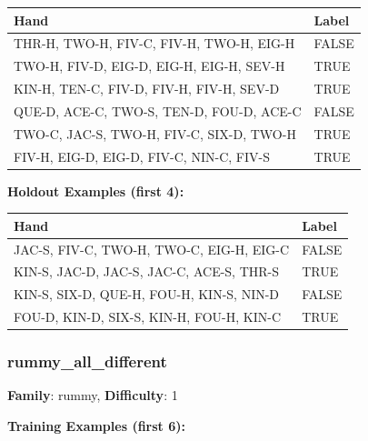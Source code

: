 \documentclass[10pt,a4paper]{article}
\begin{document}
\begin{small}
\begin{tabular}{p{8cm}l}
\toprule
Hand & Label \\
\midrule
THR-H, TWO-H, FIV-C, FIV-H, TWO-H, EIG-H & \textcolor{negative}{FALSE} \\
TWO-H, FIV-D, EIG-D, EIG-H, EIG-H, SEV-H & \textcolor{positive}{TRUE} \\
KIN-H, TEN-C, FIV-D, FIV-H, FIV-H, SEV-D & \textcolor{positive}{TRUE} \\
QUE-D, ACE-C, TWO-S, TEN-D, FOU-D, ACE-C & \textcolor{negative}{FALSE} \\
TWO-C, JAC-S, TWO-H, FIV-C, SIX-D, TWO-H & \textcolor{positive}{TRUE} \\
FIV-H, EIG-D, EIG-D, FIV-C, NIN-C, FIV-S & \textcolor{positive}{TRUE} \\
\bottomrule
\end{tabular}
\end{small}

\textbf{Holdout Examples (first 4):}

\begin{small}
\begin{tabular}{p{8cm}l}
\toprule
Hand & Label \\
\midrule
JAC-S, FIV-C, TWO-H, TWO-C, EIG-H, EIG-C & \textcolor{negative}{FALSE} \\
KIN-S, JAC-D, JAC-S, JAC-C, ACE-S, THR-S & \textcolor{positive}{TRUE} \\
KIN-S, SIX-D, QUE-H, FOU-H, KIN-S, NIN-D & \textcolor{negative}{FALSE} \\
FOU-D, KIN-D, SIX-S, KIN-H, FOU-H, KIN-C & \textcolor{positive}{TRUE} \\
\bottomrule
\end{tabular}
\end{small}

\vspace{0.5cm}

\subsubsection{rummy\_all\_different}

\textbf{Family}: rummy, \textbf{Difficulty}: 1

\textbf{Training Examples (first 6):}
\end{document}

